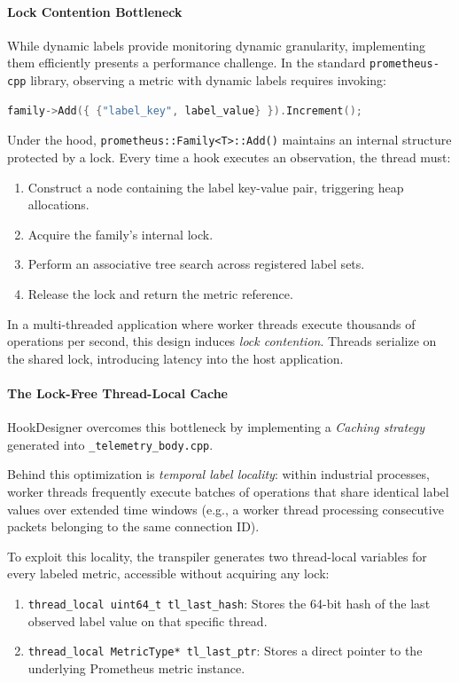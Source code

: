\paragraph{Lock Contention Bottleneck}
\label{subsubsec:lock_contention}

While dynamic labels provide monitoring dynamic granularity, implementing them efficiently presents a performance challenge.
In the standard \texttt{prometheus-cpp} library, observing a metric with dynamic labels requires invoking:
\begin{lstlisting}[language=C++, basicstyle=\ttfamily\footnotesize]
family->Add({ {"label_key", label_value} }).Increment();
\end{lstlisting}
Under the hood, \texttt{prometheus::Family<T>::Add()} maintains an internal structure protected by a lock.
Every time a hook executes an observation, the thread must:
\begin{enumerate}
	\item Construct a node containing the label key-value pair, triggering heap allocations.
	\item Acquire the family's internal lock.
	\item Perform an associative tree search across registered label sets.
	\item Release the lock and return the metric reference.
\end{enumerate}

In a multi-threaded application where worker threads execute thousands of operations per second, this design induces \emph{lock contention}.
Threads serialize on the shared lock, introducing latency into the host application.

\paragraph{The Lock-Free Thread-Local Cache}

HookDesigner overcomes this bottleneck by implementing a \emph{Caching strategy} generated into \texttt{\_telemetry\_body.cpp}.

Behind this optimization is \emph{temporal label locality}: within industrial processes, worker threads frequently execute batches of operations that share identical label values over extended time windows (e.g., a worker thread processing consecutive packets belonging to the same connection ID).

To exploit this locality, the transpiler generates two thread-local variables for every labeled metric, accessible without acquiring any lock:
\begin{enumerate}
	\item \texttt{thread\_local uint64\_t tl\_last\_hash}: Stores the 64-bit hash of the last observed label value on that specific thread.
	\item \texttt{thread\_local MetricType* tl\_last\_ptr}: Stores a direct pointer to the underlying Prometheus metric instance.
\end{enumerate}

